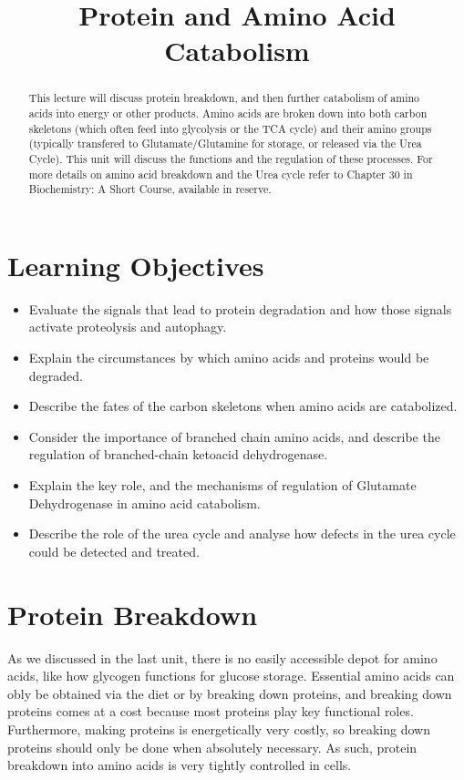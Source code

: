 \documentclass{tufte-handout}
\title{Protein and Amino Acid Catabolism}
\author{}
\date{}  %
\begin{document}
\maketitle%

\begin{abstract}
\noindent This lecture will discuss protein breakdown, and then further catabolism of amino acids into energy or other products.  Amino acids are broken down into both carbon skeletons (which often feed into glycolysis or the TCA cycle) and their amino groups (typically transfered to Glutamate/Glutamine for storage, or released via the Urea Cycle).  This unit will discuss the functions and the regulation of these processes.  For more details on amino acid breakdown and the Urea cycle refer to Chapter 30 in Biochemistry: A Short Course, available in reserve\cite{Berg2015}.
\end{abstract}

\tableofcontents

\pagebreak
\section{Learning Objectives}

\begin{itemize}
\item Evaluate the signals that lead to protein degradation and how those signals activate proteolysis and autophagy.
\item Explain the circumstances by which amino acids and proteins would be degraded.
\item Describe the fates of the carbon skeletons when amino acids are catabolized.
\item Consider the importance of branched chain amino acids, and describe the regulation of branched-chain ketoacid dehydrogenase.
\item Explain the key role, and the mechanisms of regulation of Glutamate Dehydrogenase in amino acid catabolism.
\item Describe the role of the urea cycle and analyse how defects in the urea cycle could be detected and treated.
\end{itemize}

\section{Protein Breakdown}

As we discussed in the last unit, there is no easily accessible depot for amino acids, like how glycogen functions for glucose storage.  Essential amino acids can obly be obtained via the diet or by breaking down proteins, and breaking down proteins comes at a cost because most proteins play key functional roles.  Furthermore, making proteins is energetically very costly, so breaking down proteins should only be done when absolutely necessary.  As such, protein breakdown into amino acids is very tightly controlled in cells.
\end{document}
